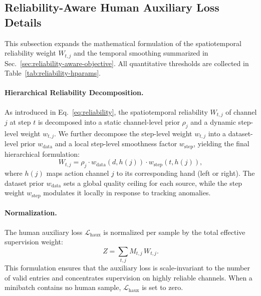 \documentclass{llmxive}
\begin{document}

\subsection{Reliability-Aware Human Auxiliary Loss Details}
\label{app:reliability-aware-human-details}

This subsection expands the mathematical formulation of the spatiotemporal reliability weight $W_{t,j}$ and the temporal smoothing summarized in Sec.~\ref{sec:reliability-aware-objective}. All quantitative thresholds are collected in Table~\ref{tab:reliability-hparams}.

\paragraph{Hierarchical Reliability Decomposition.}
As introduced in Eq.~\ref{eq:reliability}, the spatiotemporal reliability $W_{t,j}$ of channel $j$ at step $t$ is decomposed into a static channel-level prior $\rho_j$ and a dynamic step-level weight $w_{t,j}$. We further decompose the step-level weight $w_{t,j}$ into a dataset-level prior $w_{\mathrm{data}}$ and a local step-level smoothness factor $w_{\mathrm{step}}$, yielding the final hierarchical formulation:
\begin{equation}
W_{t,j} = \rho_j \cdot w_{\mathrm{data}}(d, h(j)) \cdot w_{\mathrm{step}}(t, h(j)),
\end{equation}
where $h(j)$ maps action channel $j$ to its corresponding hand (left or right). The dataset prior $w_{\mathrm{data}}$ sets a global quality ceiling for each source, while the step weight $w_{\mathrm{step}}$ modulates it locally in response to tracking anomalies.



\paragraph{Normalization.}
The human auxiliary loss $\mathcal{L}_{\mathrm{haux}}$ is normalized per sample by the total effective supervision weight:
\begin{equation}
Z = \sum_{t,j} M_{t,j}\,W_{t,j}.
\end{equation}
This formulation ensures that the auxiliary loss is scale-invariant to the number of valid entries and concentrates supervision on highly reliable channels. When a minibatch contains no human sample, $\mathcal{L}_{\mathrm{haux}}$ is set to zero.
\end{document}

